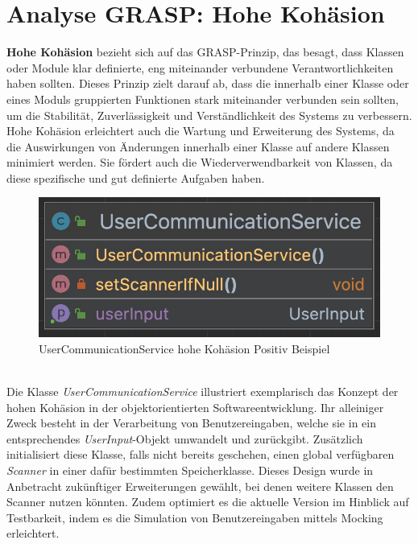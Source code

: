 \section{Analyse GRASP: Hohe Kohäsion}
\textbf{Hohe Kohäsion} bezieht sich auf das GRASP-Prinzip, das besagt, dass Klassen oder Module klar definierte, eng miteinander verbundene Verantwortlichkeiten haben sollten. Dieses Prinzip zielt darauf ab, dass die innerhalb einer Klasse oder eines Moduls gruppierten Funktionen stark miteinander verbunden sein sollten, um die Stabilität, Zuverlässigkeit und Verständlichkeit des Systems zu verbessern. Hohe Kohäsion erleichtert auch die Wartung und Erweiterung des Systems, da die Auswirkungen von Änderungen innerhalb einer Klasse auf andere Klassen minimiert werden. Sie fördert auch die Wiederverwendbarkeit von Klassen, da diese spezifische und gut definierte Aufgaben haben.\newline
\begin{figure}[ht]
    \centering
    \includegraphics[width=0.7\linewidth]{Bilder/UserCommunicationServiceUML.png}
    \caption{UserCommunicationService hohe Kohäsion Positiv Beispiel}
    \label{fig:UserCommunicationService-uml}
\end{figure}\\
Die Klasse \textit{UserCommunicationService} illustriert exemplarisch das Konzept der hohen Kohäsion in der objektorientierten Softwareentwicklung. Ihr alleiniger Zweck besteht in der Verarbeitung von Benutzereingaben, welche sie in ein entsprechendes \textit{UserInput}-Objekt umwandelt und zurückgibt. Zusätzlich initialisiert diese Klasse, falls nicht bereits geschehen, einen global verfügbaren \textit{Scanner} in einer dafür bestimmten Speicherklasse. Dieses Design wurde in Anbetracht zukünftiger Erweiterungen gewählt, bei denen weitere Klassen den Scanner nutzen könnten. Zudem optimiert es die aktuelle Version im Hinblick auf Testbarkeit, indem es die Simulation von Benutzereingaben mittels Mocking erleichtert.
